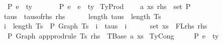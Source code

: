 \begin{isabellebody}
\ \ \ \ \ {\isasymGamma}\ {\isasymturnstile}{\isacharbraceleft}{\kern0pt}P{\isacharbraceright}{\kern0pt}\ e{}\ {\isacharcolon}{\kern0pt}\ ty{}\ {\isacharequal}{\kern0pt}{\isacharequal}{\kern0pt}{\isachargreater}{\kern0pt}\isanewline
\ \ \ \ \ {\isasymGamma}\ {\isasymturnstile}{\isacharbraceleft}{\kern0pt}P{\isacharbraceright}{\kern0pt}\ e{}\ {\isasymcdot}\ e{}\ {\isacharcolon}{\kern0pt}\ ty{}{\isachardoublequoteclose}\isanewline
{\isacharbar}{\kern0pt}\ TyProd{\isacharcolon}{\kern0pt}\isanewline
\ \ \ \ {\isachardoublequoteopen}{\isacharparenleft}{\kern0pt}{\isacharparenleft}{\kern0pt}a{\isacharcomma}{\kern0pt}\ xs{\isacharparenright}{\kern0pt}{\isacharcomma}{\kern0pt}\ rhs{\isacharparenright}{\kern0pt}\ {\isasymin}\ set\ P\ {\isacharequal}{\kern0pt}{\isacharequal}{\kern0pt}{\isachargreater}{\kern0pt}\isanewline
\ \ \ \ \ taus\ {\isacharequal}{\kern0pt}\ taus{\isacharunderscore}{\kern0pt}of{\isacharunderscore}{\kern0pt}rhs\ rhs\ {\isacharequal}{\kern0pt}{\isacharequal}{\kern0pt}{\isachargreater}{\kern0pt}\isanewline
\ \ \ \ \ length\ taus\ {\isacharequal}{\kern0pt}\ length\ Ts\ {\isacharequal}{\kern0pt}{\isacharequal}{\kern0pt}{\isachargreater}{\kern0pt}\isanewline
\ \ \ \ \ {\isacharparenleft}{\kern0pt}{\isasymforall}i\ {\isacharless}{\kern0pt}\ length\ Ts{\isachardot}{\kern0pt}\ {\isasymGamma}\ {\isasymturnstile}{\isacharbraceleft}{\kern0pt}P{\isacharbraceright}{\kern0pt}\ {\isacharparenleft}{\kern0pt}Graph\ {\isacharparenleft}{\kern0pt}Ts\ {\isacharbang}{\kern0pt}\ i{\isacharparenright}{\kern0pt}{\isacharparenright}{\kern0pt}\ {\isacharcolon}{\kern0pt}\ taus\ {\isacharbang}{\kern0pt}\ i{\isacharparenright}{\kern0pt}\ {\isacharequal}{\kern0pt}{\isacharequal}{\kern0pt}{\isachargreater}{\kern0pt}\isanewline
\ \ \ \ \ set\ xs\ {\isacharequal}{\kern0pt}\ FLrhs\ rhs\ {\isacharequal}{\kern0pt}{\isacharequal}{\kern0pt}{\isachargreater}{\kern0pt}\isanewline
\ \ \ \ \ {\isasymGamma}\ {\isasymturnstile}{\isacharbraceleft}{\kern0pt}P{\isacharbraceright}{\kern0pt}\ {\isacharparenleft}{\kern0pt}Graph\ {\isacharparenleft}{\kern0pt}app{\isacharunderscore}{\kern0pt}prodrule\ Ts\ rhs{\isacharparenright}{\kern0pt}{\isacharparenright}{\kern0pt}\ {\isacharcolon}{\kern0pt}\ TBase\ a\ xs{\isachardoublequoteclose}\isanewline
{\isacharbar}{\kern0pt}\ TyCong{\isacharcolon}{\kern0pt}\isanewline
\ \ \ \ {\isachardoublequoteopen}{\isasymGamma}\ {\isasymturnstile}{\isacharbraceleft}{\kern0pt}P{\isacharbraceright}{\kern0pt}\ e{}\ {\isacharcolon}{\kern0pt}\ ty\ {\isacharequal}{\kern0pt}{\isacharequal}{\kern0pt}{\isachargreater}{\kern0pt}\isanewline

\end{isabellebody}
